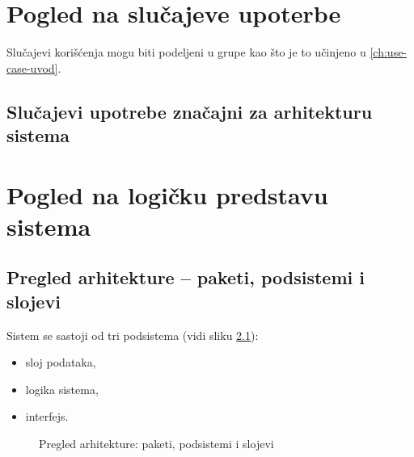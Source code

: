 \chapter{Pogled na slučajeve upoterbe}
Slučajevi korišćenja mogu biti podeljeni u grupe kao što je to učinjeno u \ref{ch:use-case-uvod}.

\section{Slučajevi upotrebe značajni za arhitekturu sistema}

\chapter{Pogled na logičku predstavu sistema}

\section{Pregled arhitekture -- paketi, podsistemi i slojevi}

Sistem se sastoji od tri podsistema (vidi sliku \ref{fig:paketi}):
\begin{itemize}
  \item sloj podataka,
  \item logika sistema,
  \item interfejs.
\end{itemize}

\begin{figure}[htbp]
  \centering
  \caption{Pregled arhitekture: paketi, podsistemi i slojevi}
  \label{fig:paketi}
\end{figure}


